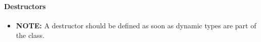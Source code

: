 \paragraph{Destructors}

\begin{itemize}
	\item 
	\begin{tcolorbox}[notitle,boxrule=0.5pt,colback=red!20,colframe=black!90]
		\textbf{NOTE:} A destructor should be defined as soon as dynamic types are part of the class. 
	\end{tcolorbox}
\end{itemize}